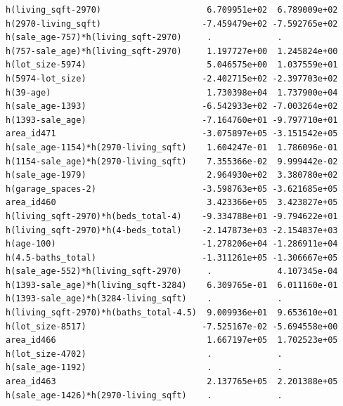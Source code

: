 \documentclass[
]{article}
\begin{document}
\begin{verbatim}
h(living_sqft-2970)                     6.709951e+02  6.789009e+02
h(2970-living_sqft)                    -7.459479e+02 -7.592765e+02
h(sale_age-757)*h(living_sqft-2970)     .             .           
h(757-sale_age)*h(living_sqft-2970)     1.197727e+00  1.245824e+00
h(lot_size-5974)                        5.046575e+00  1.037559e+01
h(5974-lot_size)                       -2.402715e+02 -2.397703e+02
h(39-age)                               1.730398e+04  1.737900e+04
h(sale_age-1393)                       -6.542933e+02 -7.003264e+02
h(1393-sale_age)                       -7.164760e+01 -9.797710e+01
area_id471                             -3.075897e+05 -3.151542e+05
h(sale_age-1154)*h(2970-living_sqft)    1.604247e-01  1.786096e-01
h(1154-sale_age)*h(2970-living_sqft)    7.355366e-02  9.999442e-02
h(sale_age-1979)                        2.964930e+02  3.380780e+02
h(garage_spaces-2)                     -3.598763e+05 -3.621685e+05
area_id460                              3.423366e+05  3.423827e+05
h(living_sqft-2970)*h(beds_total-4)    -9.334788e+01 -9.794622e+01
h(living_sqft-2970)*h(4-beds_total)    -2.147873e+03 -2.154837e+03
h(age-100)                             -1.278206e+04 -1.286911e+04
h(4.5-baths_total)                     -1.311261e+05 -1.306667e+05
h(sale_age-552)*h(living_sqft-2970)     .             4.107345e-04
h(1393-sale_age)*h(living_sqft-3284)    6.309765e-01  6.011160e-01
h(1393-sale_age)*h(3284-living_sqft)    .             .           
h(living_sqft-2970)*h(baths_total-4.5)  9.009936e+01  9.653610e+01
h(lot_size-8517)                       -7.525167e-02 -5.694558e+00
area_id466                              1.667197e+05  1.702523e+05
h(lot_size-4702)                        .             .           
h(sale_age-1192)                        .             .           
area_id463                              2.137765e+05  2.201388e+05
h(sale_age-1426)*h(2970-living_sqft)    .             .           
                                                                  

\end{verbatim}
\end{document}
